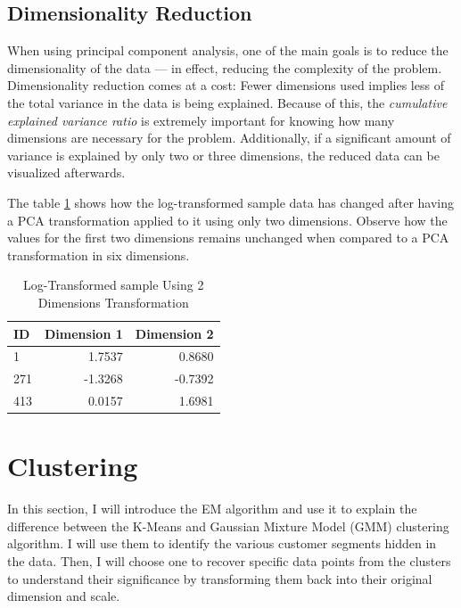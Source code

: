\documentclass[a4paper]{article}
\begin{document}
\subsection{Dimensionality Reduction}

When using principal component analysis, one of the main goals is to reduce the dimensionality of the data — in effect, reducing the complexity of the problem. Dimensionality reduction comes at a cost: Fewer dimensions used implies less of the total variance in the data is being explained. Because of this, the \textit{cumulative explained variance ratio} is extremely important for knowing how many dimensions are necessary for the problem. Additionally, if a significant amount of variance is explained by only two or three dimensions, the reduced data can be visualized afterwards.

The table \ref{tab:sample_transformed_2} shows how the log-transformed sample data has changed after having a PCA transformation applied to it using only two dimensions. Observe how the values for the first two dimensions remains unchanged when compared to a PCA transformation in six dimensions.

\begin{table}[ht!]
\centering
\begin{tabular}{l|rr}
{ID} &  Dimension 1 &  Dimension 2 \\\hline
1 &       1.7537 &       0.8680 \\
271 &      -1.3268 &      -0.7392 \\
413 &       0.0157 &       1.6981 \\

\end{tabular}
\caption{\label{tab:sample_transformed_2}Log-Transformed sample Using 2 Dimensions Transformation}
\end{table}



\section{Clustering}
\label{sec:clustering}
In this section, I will introduce the EM algorithm and use it to explain the difference between the K-Means and Gaussian Mixture Model (GMM) clustering algorithm. I will use them to identify the various customer segments hidden in the data. Then, I will choose one to recover specific data points from the clusters to understand their significance by transforming them back into their original dimension and scale. 
\end{document}
